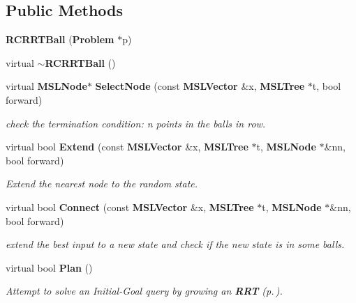 \subsection*{Public Methods}
\begin{CompactItemize}
\item 
{\bf RCRRTBall} ({\bf Problem} $\ast$p)
\item 
virtual {\bf $\sim$RCRRTBall} ()
\item 
virtual {\bf MSLNode}$\ast$ {\bf Select\-Node} (const {\bf MSLVector} \&x, {\bf MSLTree} $\ast$t, bool forward)
\begin{CompactList}\small\item\em check the termination condition: n points in the balls in row.\item\end{CompactList}\item 
virtual bool {\bf Extend} (const {\bf MSLVector} \&x, {\bf MSLTree} $\ast$t, {\bf MSLNode} $\ast$\&nn, bool forward)
\begin{CompactList}\small\item\em Extend the nearest node to the random state.\item\end{CompactList}\item 
virtual bool {\bf Connect} (const {\bf MSLVector} \&x, {\bf MSLTree} $\ast$t, {\bf MSLNode} $\ast$\&nn, bool forward)
\begin{CompactList}\small\item\em extend the best input to a new state and check if the new state is in some balls.\item\end{CompactList}\item 
virtual bool {\bf Plan} ()
\begin{CompactList}\small\item\em Attempt to solve an Initial-Goal query by growing an {\bf RRT} {\rm (p.\,\pageref{classRRT})}.\item\end{CompactList}\end{CompactItemize}
